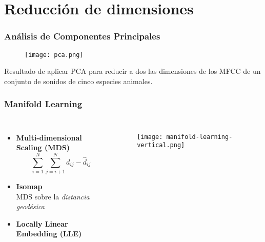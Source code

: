 \section{Reducción de dimensiones}\label{sec:dimensionalityReduction}

\begin{frame}
    \frametitle{Análisis de Componentes Principales}

    \begin{figure}[!h]
        \centering
        \texttt{[image: pca.png]}
    \end{figure}

    {\footnotesize
    Resultado de aplicar PCA para reducir a dos las dimensiones de los MFCC de un conjunto de sonidos de cinco especies animales.
    }
\end{frame}

\begin{frame}
    \frametitle{Manifold Learning}

    \begin{columns}

        \begin{itemize}
            \item<2-> \textbf{Multi-dimensional Scaling (MDS)}
            \begin{equation*}
                \sum_{i=1}^{N}\sum_{j=i+1}^{N}{d_{ij} - \hat{d}_{ij}}
            \end{equation*}
            \item<3-> \textbf{Isomap} \\
            MDS sobre la \textit{distancia geodésica}
            \item<4-> \textbf{Locally Linear Embedding (LLE)}
        \end{itemize}


        \begin{figure}[!h]
            \centering
            \texttt{[image: manifold-learning-vertical.png]}
        \end{figure}

    \end{columns}
\end{frame}